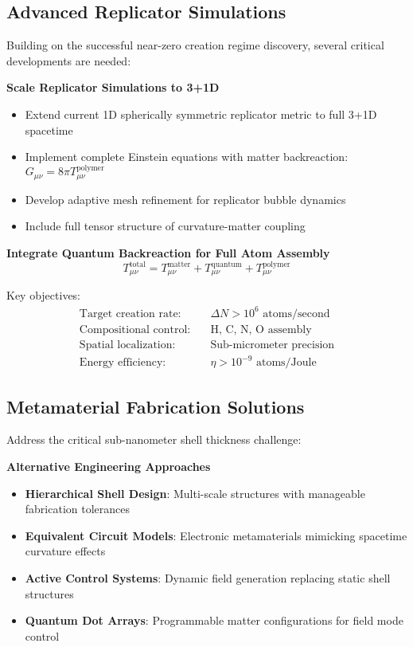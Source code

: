 \documentclass[11pt]{article}
\begin{document}
\subsection{Advanced Replicator Simulations}

Building on the successful near-zero creation regime discovery, several critical developments are needed:

\textbf{Scale Replicator Simulations to 3+1D}
\begin{itemize}
\item Extend current 1D spherically symmetric replicator metric to full 3+1D spacetime
\item Implement complete Einstein equations with matter backreaction: $G_{\mu\nu} = 8\pi T_{\mu\nu}^{\text{polymer}}$
\item Develop adaptive mesh refinement for replicator bubble dynamics
\item Include full tensor structure of curvature-matter coupling
\end{itemize}

\textbf{Integrate Quantum Backreaction for Full Atom Assembly}
\begin{equation}
T_{\mu\nu}^{\text{total}} = T_{\mu\nu}^{\text{matter}} + T_{\mu\nu}^{\text{quantum}} + T_{\mu\nu}^{\text{polymer}}
\end{equation}

Key objectives:
\begin{align}
\text{Target creation rate:} &\quad \Delta N > 10^{6} \text{ atoms/second} \\
\text{Compositional control:} &\quad \text{H, C, N, O assembly} \\
\text{Spatial localization:} &\quad \text{Sub-micrometer precision} \\
\text{Energy efficiency:} &\quad \eta > 10^{-9} \text{ atoms/Joule}
\end{align}

\subsection{Metamaterial Fabrication Solutions}

Address the critical sub-nanometer shell thickness challenge:

\textbf{Alternative Engineering Approaches}
\begin{itemize}
\item \textbf{Hierarchical Shell Design}: Multi-scale structures with manageable fabrication tolerances
\item \textbf{Equivalent Circuit Models}: Electronic metamaterials mimicking spacetime curvature effects
\item \textbf{Active Control Systems}: Dynamic field generation replacing static shell structures
\item \textbf{Quantum Dot Arrays}: Programmable matter configurations for field mode control
\end{itemize}
\end{document}

